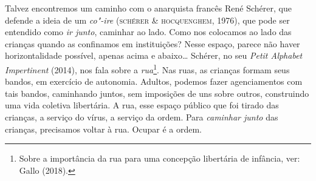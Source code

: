 Talvez encontremos um caminho com o anarquista francês René Schérer, que
defende a ideia de um \emph{co"-ire} (\textsc{schérer} \& \textsc{hocquenghem},
1976), que pode ser entendido como \emph{ir junto}, caminhar ao lado.
Como nos colocamos ao lado das crianças quando as confinamos em
instituições? Nesse espaço, parece não haver horizontalidade possível,
apenas acima e abaixo\ldots{} Schérer, no seu \emph{Petit Alphabet
Impertinent} (2014), nos fala sobre a \textit{rua}\footnote{Sobre a
  importância da rua para uma concepção libertária de infância, ver:
  Gallo (2018).}. Nas ruas, as crianças formam seus bandos, em exercício
de autonomia. Adultos, podemos fazer agenciamentos com tais bandos,
caminhando juntos, sem imposições de uns sobre outros, construindo uma
vida coletiva libertária. A rua, esse espaço público que foi tirado das
crianças, a serviço do vírus, a serviço da ordem. Para \emph{caminhar
junto} das crianças, precisamos voltar à rua. Ocupar é a ordem.

